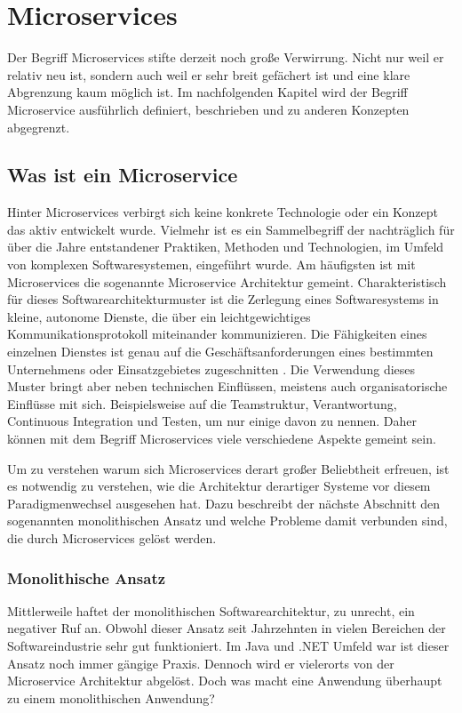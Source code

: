 \chapter{Microservices}

Der Begriff Microservices stifte derzeit noch große Verwirrung. Nicht nur weil er relativ neu ist, sondern auch weil er sehr breit gefächert ist und eine klare Abgrenzung kaum möglich ist. Im nachfolgenden Kapitel wird der Begriff Microservice ausführlich definiert, beschrieben und zu anderen Konzepten abgegrenzt.

\section{Was ist ein Microservice}

Hinter Microservices verbirgt sich keine konkrete Technologie oder ein Konzept das aktiv entwickelt wurde. Vielmehr ist es ein Sammelbegriff der nachträglich für über die Jahre entstandener Praktiken, Methoden und Technologien, im Umfeld von komplexen Softwaresystemen, eingeführt wurde. Am häufigsten ist mit Microservices die sogenannte Microservice Architektur gemeint. Charakteristisch für dieses Softwarearchitekturmuster ist die Zerlegung eines Softwaresystems in kleine, autonome Dienste, die über ein leichtgewichtiges Kommunikationsprotokoll miteinander kommunizieren. Die Fähigkeiten eines einzelnen Dienstes ist genau auf die Geschäftsanforderungen eines bestimmten Unternehmens oder Einsatzgebietes zugeschnitten \cite{FowlerMS}. Die Verwendung dieses Muster bringt aber neben technischen Einflüssen, meistens auch organisatorische Einflüsse mit sich. Beispielsweise auf die Teamstruktur, Verantwortung, Continuous Integration und Testen, um nur einige davon zu nennen. Daher können mit dem Begriff Microservices viele verschiedene Aspekte gemeint sein.

Um zu verstehen warum sich Microservices derart großer Beliebtheit erfreuen, ist es notwendig zu verstehen, wie die Architektur derartiger Systeme vor diesem Paradigmenwechsel ausgesehen hat. Dazu beschreibt der nächste Abschnitt den sogenannten monolithischen Ansatz und welche Probleme damit verbunden sind, die durch Microservices gelöst werden.

\subsection{Monolithische Ansatz}

Mittlerweile haftet der monolithischen Softwarearchitektur, zu unrecht, ein negativer Ruf an. Obwohl dieser Ansatz seit Jahrzehnten  in vielen Bereichen der Softwareindustrie sehr gut funktioniert. Im Java und .NET Umfeld war \bzw ist dieser Ansatz noch immer gängige Praxis. Dennoch wird er vielerorts von der Microservice Architektur abgelöst. Doch was macht eine Anwendung überhaupt zu einem monolithischen Anwendung?

